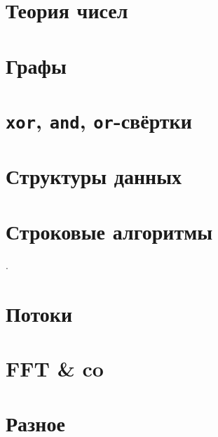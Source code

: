 \documentclass[a4paper,twocolumn,8pt]{extarticle}
\begin{document}
    \pagestyle{fancy}
    \tableofcontents
    \newpage
    \section{Теория чисел}
    
    
    

    \section{Графы}
    
    
    

    \section{\texttt{xor}, \texttt{and}, \texttt{or}-свёртки}
    

    \section{Структуры данных}
    
    
    

    \section{Строковые алгоритмы}
    
    
    
    
    .
    

    \section{Потоки}
    
    

    \section{FFT \& co}
    
    \section{Разное}
    
\end{document}

